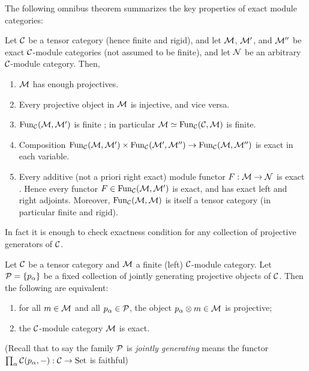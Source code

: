 \documentclass{amsart}
\begin{document}
The following omnibus theorem summarizes the key properties of exact module categories: 
\begin{theorem} \label{Thm:ExactModCatOmnibus}
	Let $\mathcal C$ be a tensor category (hence finite and rigid), and let $\mathcal M$, $\mathcal M'$, and $\mathcal M''$ be exact $\mathcal C$-module categories (not assumed to be finite), and let $\mathcal N$ be an arbitrary $\mathcal C$-module category. Then,
	\begin{enumerate}
		\item $\mathcal M$ has enough projectives. \cite[Lemma 3.4]{EO-ftc} \cite[Lemma 2.7.1]{EGNO}
		\item Every projective object in $\mathcal M$  is injective, and vice versa. \cite[Cor. 3.6]{EO-ftc} \cite[Cor 2.7.4]{EGNO}
		\item $\operatorname{Fun}_{\mathcal C}(\mathcal M, \mathcal M')$ is finite \cite[Prop 2.13.5]{EGNO}; in particular $\mathcal M \simeq \operatorname{Fun}_{\mathcal C}(\mathcal C, \mathcal M)$ is finite.
		\item Composition $\operatorname{Fun}_{\mathcal C}(\mathcal M, \mathcal M') \times \operatorname{Fun}_{\mathcal C}(\mathcal M', \mathcal M'') \to \operatorname{Fun}_{\mathcal C}(\mathcal M, \mathcal M'')$ is exact in each variable. \cite[Lemma 3.20]{EO-ftc} \cite[Lemma 2.13.2]{EGNO}		
		\item Every additive (not a priori right exact) module functor $F:\mathcal M \to \mathcal N$ is exact \cite[Prop. 3.11]{EO-ftc} \cite[Prop 2.7.8]{EGNO}. Hence every functor $F \in \operatorname{Fun}_{\mathcal C}(\mathcal M, \mathcal M')$ is exact, and has exact left and right adjoints. Moreover, $\operatorname{Fun}_{\mathcal C}(\mathcal M,\mathcal M)$ is itself a tensor category (in particular finite and rigid). 
	\end{enumerate}
\end{theorem}

\noindent In fact it is enough to check exactness condition for any collection of projective generators of $\mathcal C$. 

\begin{lemma} \label{lma:Exact_checked_on_proj_gens}
	Let $\mathcal C$ be a tensor category and $\mathcal M$ a finite (left) $\mathcal C$-module category. Let $\mathcal P = \{ p_\alpha \}$ be a fixed collection of jointly generating projective objects of  $\mathcal C$. Then the following are equivalent:
	\begin{enumerate}
		\item for all $m \in \mathcal M$ and all $p_\alpha \in \mathcal P$, the object $p_\alpha \otimes m \in \mathcal M$ is projective;
		\item the $\mathcal C$-module category $\mathcal M$ is exact.
	\end{enumerate}
	(Recall that to say the family $\mathcal P$ is {\em jointly generating} means the functor $\prod_\alpha\mathcal C(p_\alpha, -): \mathcal C \to \mathrm{Set}$ is faithful)
\end{lemma}
\end{document}
